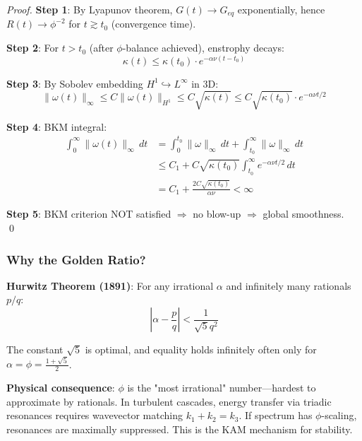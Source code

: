 \documentclass[12pt,a4paper]{article}
\begin{document}
\begin{proof}
\textbf{Step 1}: By Lyapunov theorem, $G(t) \to G_{eq}$ exponentially, hence $R(t) \to \phi^{-2}$ for $t \gtrsim t_0$ (convergence time).

\textbf{Step 2}: For $t > t_0$ (after $\phi$-balance achieved), enstrophy decays:
\begin{equation}
\kappa(t) \leq \kappa(t_0) \cdot e^{-\alpha\nu(t - t_0)}
\end{equation}

\textbf{Step 3}: By Sobolev embedding $H^1 \hookrightarrow L^\infty$ in 3D:
\begin{equation}
\|\omega(t)\|_\infty \leq C\|\omega(t)\|_{H^1} \leq C\sqrt{\kappa(t)} \leq C\sqrt{\kappa(t_0)} \cdot e^{-\alpha\nu t/2}
\end{equation}

\textbf{Step 4}: BKM integral:
\begin{align}
\int_0^\infty \|\omega(t)\|_\infty\, dt &= \int_0^{t_0} \|\omega\|_\infty\, dt + \int_{t_0}^\infty \|\omega\|_\infty\, dt \\
&\leq C_1 + C\sqrt{\kappa(t_0)} \int_{t_0}^\infty e^{-\alpha\nu t/2}\, dt \\
&= C_1 + \frac{2C\sqrt{\kappa(t_0)}}{\alpha\nu} < \infty
\end{align}

\textbf{Step 5}: BKM criterion NOT satisfied $\Rightarrow$ no blow-up $\Rightarrow$ global smoothness. \qed
\end{proof}

\subsubsection{Why the Golden Ratio?}

\textbf{Hurwitz Theorem (1891)}: For any irrational $\alpha$ and infinitely many rationals $p/q$:
\begin{equation}
\left|\alpha - \frac{p}{q}\right| < \frac{1}{\sqrt{5}q^2}
\end{equation}

The constant $\sqrt{5}$ is optimal, and equality holds infinitely often only for $\alpha = \phi = \frac{1 + \sqrt{5}}{2}$.

\textbf{Physical consequence}: $\phi$ is the "most irrational" number—hardest to approximate by rationals. In turbulent cascades, energy transfer via triadic resonances requires wavevector matching $k_1 + k_2 = k_3$. If spectrum has $\phi$-scaling, resonances are maximally suppressed. This is the KAM mechanism for stability.
\end{document}

